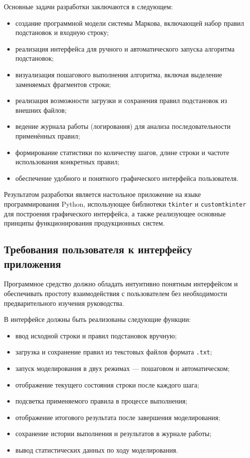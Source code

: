 Основные задачи разработки заключаются в следующем:
\begin{itemize}
	\item создание программной модели системы Маркова, включающей набор правил подстановок и входную строку;
	\item реализация интерфейса для ручного и автоматического запуска алгоритма подстановок;
	\item визуализация пошагового выполнения алгоритма, включая выделение заменяемых фрагментов строки;
	\item реализация возможности загрузки и сохранения правил подстановок из внешних файлов;
	\item ведение журнала работы (логирования) для анализа последовательности применённых правил;
	\item формирование статистики по количеству шагов, длине строки и частоте использования конкретных правил;
	\item обеспечение удобного и понятного графического интерфейса пользователя.
\end{itemize}

Результатом разработки является настольное приложение на языке программирования Python, использующее библиотеки \texttt{tkinter} и \texttt{customtkinter} для построения графического интерфейса, а также реализующее основные принципы функционирования продукционных систем.

\subsection{Требования пользователя к интерфейсу приложения}

Программное средство должно обладать интуитивно понятным интерфейсом и обеспечивать простоту взаимодействия с пользователем без необходимости предварительного изучения руководства.  

В интерфейсе должны быть реализованы следующие функции:
\begin{itemize}
	\item ввод исходной строки и правил подстановок вручную;
	\item загрузка и сохранение правил из текстовых файлов формата \texttt{.txt};
	\item запуск моделирования в двух режимах — пошаговом и автоматическом;
	\item отображение текущего состояния строки после каждого шага;
	\item подсветка применяемого правила в процессе выполнения;
	\item отображение итогового результата после завершения моделирования;
	\item сохранение истории выполнения и результатов в журнале работы;
	\item вывод статистических данных по ходу моделирования.
\end{itemize}

